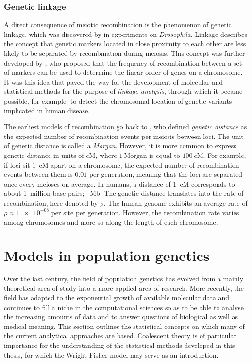 %
\subsubsection{Genetic linkage}
\label{sec:linkage}
%

A direct consequence of meiotic recombination is the phenomenon of genetic linkage, which was discovered by \citet{morgan1911} in experiments on \textsl{Drosophila}.
Linkage describes the concept that genetic markers located in close proximity to each other are less likely to be separated by recombination during meiosis.
This concept was further developed by \citet{sturtevant1913}, who proposed that the frequency of recombination between a set of markers can be used to determine the linear order of genes on a chromosome.
It was this idea that paved the way for the development of molecular and statistical methods for the purpose of \emph{linkage analysis}, through which it became possible, for example, to detect the chromosomal location of genetic variants implicated in human disease.

The earliest models of recombination go back to \citet{haldane1919}, who defined \emph{genetic distance}
as the expected number of recombination events per meiosis between  loci.
The unit of genetic distance is called a \emph{Morgan}.
However, it is more common to express genetic distance in units of \gls{cM}, where ${1~\text{Morgan}}$ is equal to ${100~\text{cM}}$.
For example, if  loci sit 1~\gls{cM} apart on a chromosome, the expected number of recombination events between them is $0.01$ per generation, meaning that the  loci are separated once every  meioses on average.
In humans, a distance of 1~\gls{cM} corresponds to about 1~million base pairs; ~\gls{Mb}.
The genetic distance translates into the rate of recombination, here denoted by $\rho$.
The human genome exhibits an average rate of ${\rho\approx\num{1e-08}}$ per site per generation.
However, the recombination rate varies among chromosomes and more so along the length of each chromosome.



%
\section{Models in population genetics}
\label{sec:popgen}
%

Over the last century, the field of population genetics has evolved from a mainly theoretical area of study into a more applied area of research.
More recently, the field has adapted to the exponential growth of available molecular data and continues to fill a niche in the computational sciences so as to be able to analyse the increasing amounts of data and to answer questions of biological as well as medical meaning.
This section outlines the statistical concepts on which many of the current analytical approaches are based.
Coalescent theory is of particular importance for the understanding of the statistical methods developed in this thesis, for which the Wright-Fisher model may serve as an introduction.

